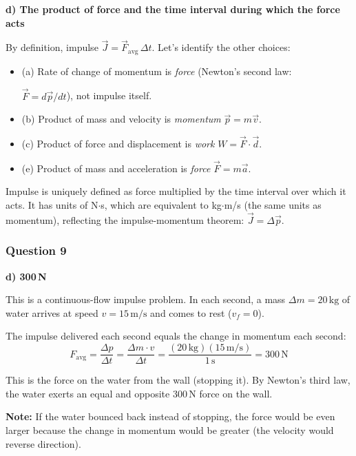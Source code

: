 \documentclass[12pt,letterpaper]{article}
\begin{document}
\begin{answerbox}
\textbf{d) The product of force and the time interval during which the force acts}
\end{answerbox}

\begin{explanationbox}
By definition, impulse $\vec{J} = \vec{F}_{\text{avg}}\,\Delta t$. Let's identify the other choices:
\begin{itemize}
\item (a) Rate of change of momentum is \emph{force} (Newton's second law:


$\vec{F} = d\vec{p}/dt$), not impulse itself.
\item (b) Product of mass and velocity is \emph{momentum} $\vec{p} = m\vec{v}$.
\item (c) Product of force and displacement is \emph{work} $W = \vec{F}\cdot\vec{d}$.
\item (e) Product of mass and acceleration is \emph{force} $\vec{F} = m\vec{a}$.
\end{itemize}

Impulse is uniquely defined as force multiplied by the time interval over which it acts. It has units of N$\cdot$s, which are equivalent to kg$\cdot$m/s (the same units as momentum), reflecting the impulse-momentum theorem: $\vec{J} = \Delta\vec{p}$.
\end{explanationbox}

\subsubsection*{Question 9}

\begin{answerbox}
\textbf{d) 300\,N}
\end{answerbox}

\begin{explanationbox}
This is a continuous-flow impulse problem. In each second, a mass $\Delta m = 20\,\text{kg}$ of water arrives at speed $v = 15\,\text{m/s}$ and comes to rest ($v_f = 0$).

The impulse delivered each second equals the change in momentum each second:
\[
F_{\text{avg}} = \frac{\Delta p}{\Delta t} = \frac{\Delta m \cdot v}{\Delta t} = \frac{(20\,\text{kg})(15\,\text{m/s})}{1\,\text{s}} = 300\,\text{N}
\]

This is the force on the water from the wall (stopping it). By Newton's third law, the water exerts an equal and opposite 300\,N force on the wall.

\textbf{Note:} If the water bounced back instead of stopping, the force would be even larger because the change in momentum would be greater (the velocity would reverse direction).
\end{explanationbox}
\end{document}
